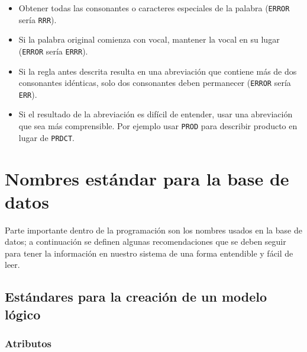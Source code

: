 \begin{itemize}
  \begin{itemize}

  \item Obtener todas las consonantes o caracteres especiales de la palabra
    (\texttt{ERROR} sería \texttt{RRR}).

  \item Si la palabra original comienza con vocal, mantener la vocal en su lugar
    (\texttt{ERROR} sería \texttt{ERRR}).

  \item Si la regla antes descrita resulta en una abreviación que contiene más
    de dos consonantes idénticas, solo dos consonantes deben permanecer
    (\texttt{ERROR} sería \texttt{ERR}).

  \item Si el resultado de la abreviación es difícil de entender, usar una
    abreviación que sea más comprensible. Por ejemplo usar \texttt{PROD} para
    describir producto en lugar de \texttt{PRDCT}.

  \end{itemize}

\end{itemize}

\section{Nombres estándar para la base de datos}

Parte importante dentro de la programación son los nombres usados en la base de
datos; a continuación se definen algunas recomendaciones que se deben seguir
para tener la información en nuestro sistema de una forma entendible y fácil de
leer.

\subsection{Estándares para la creación de un modelo lógico}

\subsubsection{Atributos}

